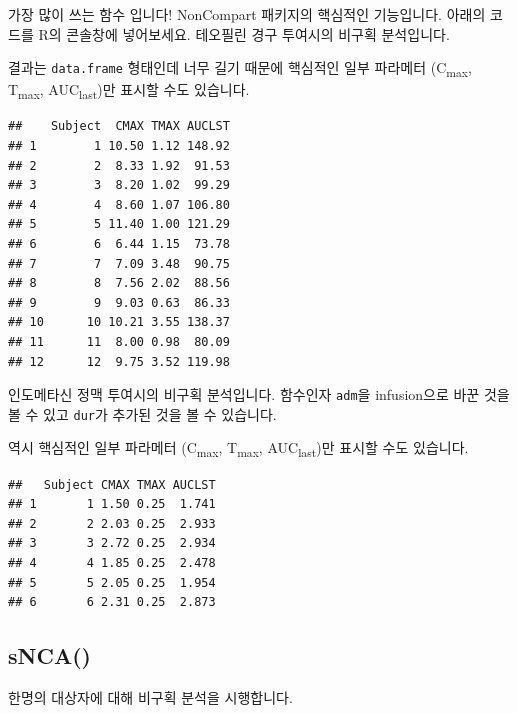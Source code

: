 \documentclass[
  11pt,
  krantz2, a4paper, twoside]{krantz}
\begin{document}
가장 많이 쓰는 함수 입니다!
NonCompart 패키지의 핵심적인 기능입니다.
아래의 코드를 R의 콘솔창에 넣어보세요.
테오필린 경구 투여시의 비구획 분석입니다.

결과는 \texttt{data.frame} 형태인데 너무 길기 때문에 핵심적인 일부 파라메터 (C\textsubscript{max}, T\textsubscript{max}, AUC\textsubscript{last})만 표시할 수도 있습니다.

\begin{verbatim}
##    Subject  CMAX TMAX AUCLST
## 1        1 10.50 1.12 148.92
## 2        2  8.33 1.92  91.53
## 3        3  8.20 1.02  99.29
## 4        4  8.60 1.07 106.80
## 5        5 11.40 1.00 121.29
## 6        6  6.44 1.15  73.78
## 7        7  7.09 3.48  90.75
## 8        8  7.56 2.02  88.56
## 9        9  9.03 0.63  86.33
## 10      10 10.21 3.55 138.37
## 11      11  8.00 0.98  80.09
## 12      12  9.75 3.52 119.98
\end{verbatim}

인도메타신 정맥 투여시의 비구획 분석입니다.
함수인자 \texttt{adm}을 infusion으로 바꾼 것을 볼 수 있고 \texttt{dur}가 추가된 것을 볼 수 있습니다.

역시 핵심적인 일부 파라메터 (C\textsubscript{max}, T\textsubscript{max}, AUC\textsubscript{last})만 표시할 수도 있습니다.

\begin{verbatim}
##   Subject CMAX TMAX AUCLST
## 1       1 1.50 0.25  1.741
## 2       2 2.03 0.25  2.933
## 3       3 2.72 0.25  2.934
## 4       4 1.85 0.25  2.478
## 5       5 2.05 0.25  1.954
## 6       6 2.31 0.25  2.873
\end{verbatim}

\hypertarget{snca}{%
\subsection{sNCA()}\label{snca}}

한명의 대상자에 대해 비구획 분석을 시행합니다.
\end{document}
